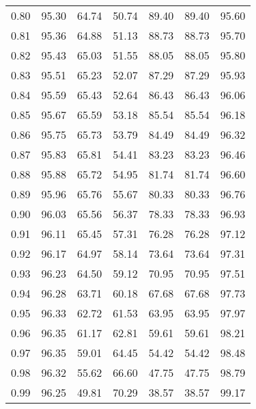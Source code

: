 \begin{tabular}{|c|c|c|c|c|c|c|}
      0.80 &     95.30 &     64.74 &      50.74 &   89.40 &      89.40 &         95.60 \\
      0.81 &     95.36 &     64.88 &      51.13 &   88.73 &      88.73 &         95.70 \\
      0.82 &     95.43 &     65.03 &      51.55 &   88.05 &      88.05 &         95.80 \\
      0.83 &     95.51 &     65.23 &      52.07 &   87.29 &      87.29 &         95.93 \\
      0.84 &     95.59 &     65.43 &      52.64 &   86.43 &      86.43 &         96.06 \\
      0.85 &     95.67 &     65.59 &      53.18 &   85.54 &      85.54 &         96.18 \\
      0.86 &     95.75 &     65.73 &      53.79 &   84.49 &      84.49 &         96.32 \\
      0.87 &     95.83 &     65.81 &      54.41 &   83.23 &      83.23 &         96.46 \\
      0.88 &     95.88 &     65.72 &      54.95 &   81.74 &      81.74 &         96.60 \\
      0.89 &     95.96 &     65.76 &      55.67 &   80.33 &      80.33 &         96.76 \\
      0.90 &     96.03 &     65.56 &      56.37 &   78.33 &      78.33 &         96.93 \\
      0.91 &     96.11 &     65.45 &      57.31 &   76.28 &      76.28 &         97.12 \\
      0.92 &     96.17 &     64.97 &      58.14 &   73.64 &      73.64 &         97.31 \\
      0.93 &     96.23 &     64.50 &      59.12 &   70.95 &      70.95 &         97.51 \\
      0.94 &     96.28 &     63.71 &      60.18 &   67.68 &      67.68 &         97.73 \\
      0.95 &     96.33 &     62.72 &      61.53 &   63.95 &      63.95 &         97.97 \\
      0.96 &     96.35 &     61.17 &      62.81 &   59.61 &      59.61 &         98.21 \\
      0.97 &     96.35 &     59.01 &      64.45 &   54.42 &      54.42 &         98.48 \\
      0.98 &     96.32 &     55.62 &      66.60 &   47.75 &      47.75 &         98.79 \\
      0.99 &     96.25 &     49.81 &      70.29 &   38.57 &      38.57 &         99.17 \\
\bottomrule
\end{tabular}
